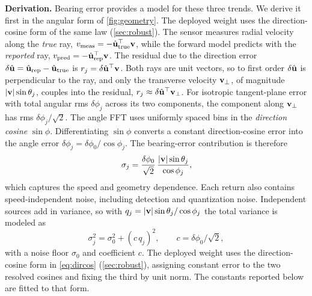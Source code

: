 \textbf{Derivation.}  Bearing error provides a model for these three
trends.  We derive it first in the angular form of
\autoref{fig:geometry}. The deployed weight uses the direction-cosine
form of the same law (\autoref{sec:robust}).  The sensor measures radial velocity along the \emph{true}
ray, $v_{\mathrm{meas}} = -\hat{\mathbf{u}}_{\mathrm{true}}^\top\mathbf{v}$, while the
forward model predicts with the \emph{reported} ray,
$v_{\mathrm{pred}} = -\hat{\mathbf{u}}_{\mathrm{rep}}^\top\mathbf{v}$.  The residual due to
the direction error $\delta\hat{\mathbf{u}} = \hat{\mathbf{u}}_{\mathrm{rep}} - \hat{\mathbf{u}}_{\mathrm{true}}$
is $r_j = \delta\hat{\mathbf{u}}^\top\mathbf{v}$.  Both rays are unit vectors, so to first
order $\delta\hat{\mathbf{u}}$ is perpendicular to the ray, and only the transverse
velocity $\mathbf{v}_\perp$, of magnitude $|\mathbf{v}|\sin\theta_j$, couples into
the residual, $r_j \approx \delta\hat{\mathbf{u}}^\top\mathbf{v}_\perp$.  For isotropic
tangent-plane error with total angular rms $\delta\phi_j$ across its
two components, the component along $\mathbf{v}_\perp$ has rms
$\delta\phi_j/\sqrt2$.  The angle FFT uses uniformly
spaced bins in the \emph{direction cosine} $\sin\phi$.
Differentiating $\sin\phi$ converts
a constant direction-cosine error into the angle error
$\delta\phi_j = \delta\phi_0/\cos\phi_j$.  The bearing-error contribution is therefore
\begin{equation}
  \sigma_j = \frac{\delta\phi_0}{\sqrt2}\,
             \frac{|\mathbf{v}|\sin\theta_j}{\cos\phi_j},
  \label{eq:law}
\end{equation}
which captures the speed and geometry dependence.  Each return also
contains speed-independent noise, including detection and quantization
noise.  Independent sources add in
variance, so with $q_j = |\mathbf{v}|\sin\theta_j/\cos\phi_j$ the total variance
is modeled as
\begin{equation}
  \sigma_j^2 = \sigma_0^2 + (c\,q_j)^2, \qquad c = \delta\phi_0/\sqrt2,
  \label{eq:law_fit}
\end{equation}
with a noise floor $\sigma_0$ and coefficient $c$.  The deployed weight
uses the direction-cosine form in \eqref{eq:dircos}
(\autoref{sec:robust}), assigning constant error to the two resolved
cosines and fixing the third by unit norm.  The constants reported
below are fitted to that form.

